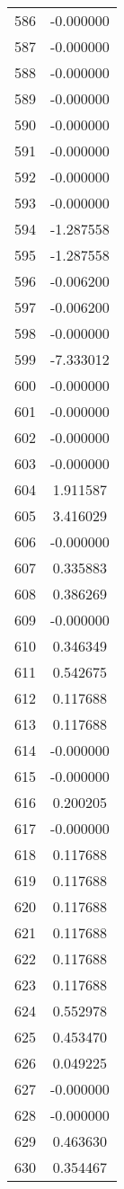 \documentclass[12pt]{article}
\begin{document}
\begin{longtable}{@{}cc@{}}
586 & -0.000000 \\
587 & -0.000000 \\
588 & -0.000000 \\
589 & -0.000000 \\
590 & -0.000000 \\
591 & -0.000000 \\
592 & -0.000000 \\
593 & -0.000000 \\
594 & -1.287558 \\
595 & -1.287558 \\
596 & -0.006200 \\
597 & -0.006200 \\
598 & -0.000000 \\
599 & -7.333012 \\
600 & -0.000000 \\
601 & -0.000000 \\
602 & -0.000000 \\
603 & -0.000000 \\
604 & 1.911587 \\
605 & 3.416029 \\
606 & -0.000000 \\
607 & 0.335883 \\
608 & 0.386269 \\
609 & -0.000000 \\
610 & 0.346349 \\
611 & 0.542675 \\
612 & 0.117688 \\
613 & 0.117688 \\
614 & -0.000000 \\
615 & -0.000000 \\
616 & 0.200205 \\
617 & -0.000000 \\
618 & 0.117688 \\
619 & 0.117688 \\
620 & 0.117688 \\
621 & 0.117688 \\
622 & 0.117688 \\
623 & 0.117688 \\
624 & 0.552978 \\
625 & 0.453470 \\
626 & 0.049225 \\
627 & -0.000000 \\
628 & -0.000000 \\
629 & 0.463630 \\
630 & 0.354467 \\

\end{longtable}
\end{document}
